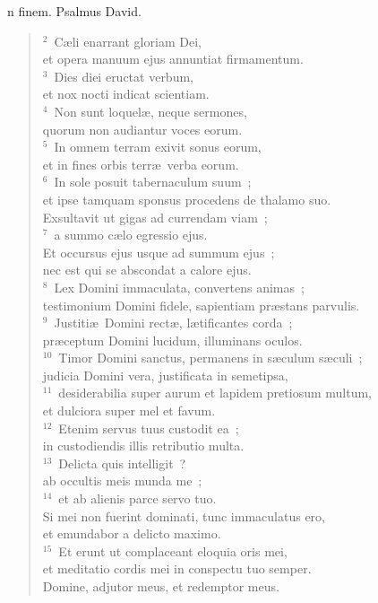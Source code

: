 \bchapter
{}n finem. Psalmus David.
\begin{flushleft}\begin{verse}\vspace{6pt}${}^{2}$~C\ae li enarrant gloriam Dei,\\ et opera manuum ejus annuntiat firmamentum.\\
${}^{3}$~Dies diei eructat verbum,\\ et nox nocti indicat scientiam.\\
${}^{4}$~Non sunt loquel\ae , neque sermones,\\ quorum non audiantur voces eorum.\\
${}^{5}$~In omnem terram exivit sonus eorum,\\ et in fines orbis terr\ae\ verba eorum.\\
${}^{6}$~In sole posuit tabernaculum suum~;\\ et ipse tamquam sponsus procedens de thalamo suo.\\ Exsultavit ut gigas ad currendam viam~;\\
${}^{7}$~a summo c\ae lo egressio ejus.\\ Et occursus ejus usque ad summum ejus~;\\ nec est qui se abscondat a calore ejus.\\
${}^{8}$~Lex Domini immaculata, convertens animas~;\\ testimonium Domini fidele, sapientiam pr\ae stans parvulis.\\
${}^{9}$~Justiti\ae\ Domini rect\ae , l\ae tificantes corda~;\\ pr\ae ceptum Domini lucidum, illuminans oculos.\\
${}^{10}$~Timor Domini sanctus, permanens in s\ae culum s\ae culi~;\\ judicia Domini vera, justificata in semetipsa,\\
${}^{11}$~desiderabilia super aurum et lapidem pretiosum multum,\\ et dulciora super mel et favum.\\
${}^{12}$~Etenim servus tuus custodit ea~;\\ in custodiendis illis retributio multa.\\
${}^{13}$~Delicta quis intelligit~?\\ ab occultis meis munda me~;\\
${}^{14}$~et ab alienis parce servo tuo.\\ Si mei non fuerint dominati, tunc immaculatus ero,\\ et emundabor a delicto maximo.\\
${}^{15}$~Et erunt ut complaceant eloquia oris mei,\\ et meditatio cordis mei in conspectu tuo semper.\\ Domine, adjutor meus, et redemptor meus.\end{verse}\end{flushleft}



